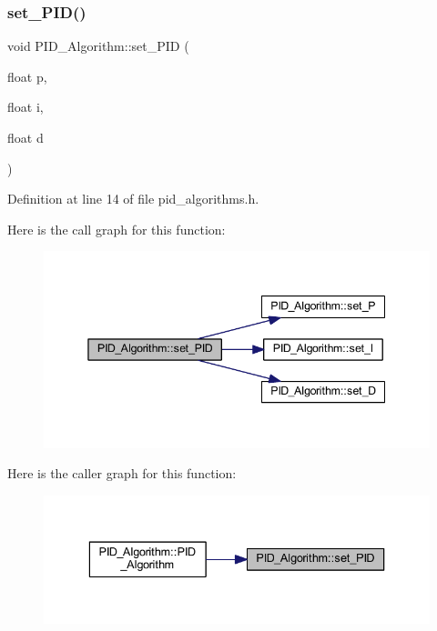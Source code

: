 \subsubsection{\texorpdfstring{set\_PID()}{set\_PID()}}
{\footnotesize\ttfamily void P\+I\+D\+\_\+\+Algorithm\+::set\+\_\+\+P\+ID (\begin{DoxyParamCaption}\item[{float}]{p,  }\item[{float}]{i,  }\item[{float}]{d }\end{DoxyParamCaption})\hspace{0.3cm}{\ttfamily [inline]}}



Definition at line 14 of file pid\+\_\+algorithms.\+h.

Here is the call graph for this function\+:
\nopagebreak
\begin{figure}[H]
\begin{center}
\leavevmode
\includegraphics[width=345pt]{class_p_i_d___algorithm_a1f6955b8c523af6e5207b598872b00f9_cgraph}
\end{center}
\end{figure}
Here is the caller graph for this function\+:
\nopagebreak
\begin{figure}[H]
\begin{center}
\leavevmode
\includegraphics[width=336pt]{class_p_i_d___algorithm_a1f6955b8c523af6e5207b598872b00f9_icgraph}
\end{center}
\end{figure}


